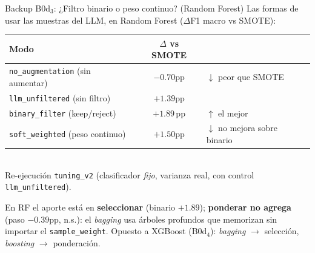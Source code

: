 
\begin{frame}{Backup B0d$_3$: ¿Filtro binario o peso continuo? (Random Forest)}
\centering
\vspace{0.6em}
{\small Las formas de usar las muestras del LLM, en Random Forest ($\Delta$F1 macro vs SMOTE):}

\vspace{0.8em}
\setlength{\tabcolsep}{10pt}
\renewcommand{\arraystretch}{1.4}
\begin{tabular}{@{}lcl@{}}
\toprule
\textbf{Modo}                              & \textbf{$\Delta$ vs SMOTE}        & \\
\midrule
\texttt{no\_augmentation} (sin aumentar)   & $-0.70$pp                         & \textcolor{red!70!black}{$\downarrow$ peor que SMOTE} \\
\texttt{llm\_unfiltered} (sin filtro)      & $+1.39$pp                         & \\
\rowcolor{uaigreen!15}
\texttt{binary\_filter} (keep/reject)      & \alert{$\boldsymbol{+1.89}$\,pp}  & \textcolor{uaigreen!55!black}{$\uparrow$ el mejor} \\
\rowcolor{gray!15}
\texttt{soft\_weighted} (peso continuo)    & $+1.50$pp                         & \textcolor{red!70!black}{$\downarrow$ no mejora sobre binario} \\
\bottomrule
\end{tabular}\\[2pt]
{\tiny Re-ejecución \texttt{tuning\_v2} (clasificador \emph{fijo}, varianza real, con control \texttt{llm\_unfiltered}).}

\vspace{0.7em}
\begin{insight}
\small En RF el aporte está en \textbf{seleccionar} (binario $+1.89$); \textbf{ponderar no agrega} (paso $-0.39$pp, n.s.): el \emph{bagging} usa árboles profundos que memorizan sin importar el \texttt{sample\_weight}. \alert{Opuesto a XGBoost} (B0d$_4$): \emph{bagging} $\to$ selección, \emph{boosting} $\to$ ponderación.
\end{insight}
\end{frame}

